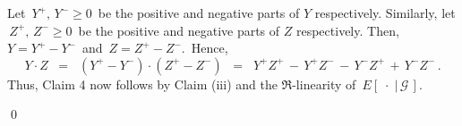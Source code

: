 \begin{enumerate}
	Let \,$Y^{+},\,Y^{-} \geq 0$\, be the positive and negative parts of $Y$ respectively.
	Similarly, let \,$Z^{+},\,Z^{-} \geq 0$\, be the positive and negative parts of $Z$ respectively.
	Then, \,$Y = Y^{+} - Y^{-}$\, and \,$Z = Z^{+} - Z^{-}$.\,
	Hence,
	\begin{equation*}
	Y \cdot Z
	\;\; = \;\; (Y^{+} - Y^{-}) \cdot (Z^{+} - Z^{-})
	\;\; = \;\; Y^{+}Z^{+} \,-\, Y^{+}Z^{-} \,-\, Y^{-}Z^{+} \,+\, Y^{-}Z^{-}\,.
	\end{equation*}
	Thus, Claim 4 now follows by Claim (iii) and the $\Re$-linearity of \,$E\!\left[\;\cdot\;\vert\,\mathcal{G}\,\right]$.
\end{enumerate}

\qed

